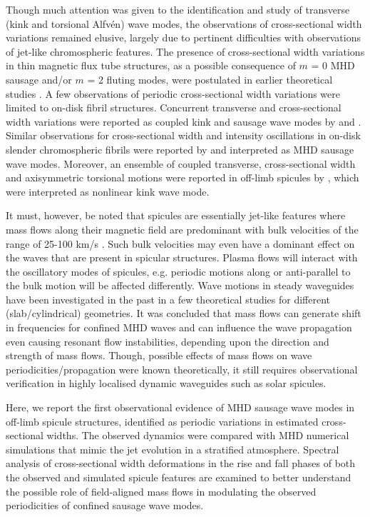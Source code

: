 Though much attention was given to the identification and study of transverse (kink and torsional Alfv\'en) wave modes, the observations of cross-sectional width variations remained elusive, largely due to pertinent difficulties with observations of jet-like chromospheric features. The presence of cross-sectional width variations in thin magnetic flux tube structures, as a possible consequence of $m$ = 0 MHD sausage and/or $m$ = 2 fluting modes, were postulated in earlier theoretical studies \citep{Ziegler1997a, Ziegler1997, Ruderman2010}. A few observations of periodic cross-sectional width variations were limited to on-disk fibril structures. Concurrent transverse and cross-sectional width variations were reported as coupled kink and sausage wave modes by \citet{Jess2012} and \citet{Morton2012}. Similar observations for cross-sectional width and intensity oscillations in on-disk slender chromospheric fibrils were reported by \citet{Gafeira2017} and interpreted as MHD sausage wave modes. Moreover, an ensemble of coupled transverse, cross-sectional width and axisymmetric torsional motions were reported in off-limb spicules by \citet{Sharma2018}, which were interpreted as nonlinear kink wave mode.

It must, however, be noted that spicules are essentially jet-like features where mass flows along their magnetic field are predominant with bulk velocities of the range of 25-100 km/s  \citep{Beckers1972ARAA1073B,Sterling2000SoPh19679S,Pereira2012}. Such bulk velocities may even have a dominant effect on the waves that are present in spicular structures. Plasma flows will interact with the oscillatory modes of spicules, e.g. periodic motions along or anti-parallel to the bulk motion will be affected differently. Wave motions in steady waveguides have been investigated in the past in a few theoretical studies \citep{Narayanan1991,nakariakov1995, terrahomem2003, soler2008} for different (slab/cylindrical) geometries. It was concluded that mass flows can generate shift in frequencies for confined MHD waves and can influence the wave propagation even causing resonant flow instabilities, depending upon the direction and strength of mass flows. Though, possible effects of mass flows on wave periodicities/propagation were known theoretically,  it still requires observational verification in highly localised dynamic waveguides such as solar spicules.

Here, we report the first observational evidence of MHD sausage wave modes in off-limb spicule structures, identified as periodic variations in estimated cross-sectional widths. The observed dynamics were compared with MHD numerical simulations that mimic the jet evolution in a stratified atmosphere. Spectral analysis of cross-sectional width deformations in the rise and fall phases of both the observed and simulated spicule features are examined to better understand the possible role of field-aligned mass flows in modulating the observed periodicities of confined sausage wave modes.  

